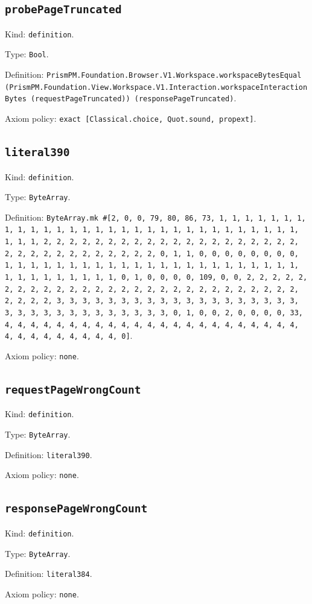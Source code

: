 \documentclass[11pt]{article}
\begin{document}
\subsection*{\texttt{probePageTruncated}}
\noindent Kind: \texttt{definition}.\par
\noindent Type: \texttt{Bool}.\par
\noindent Definition: \texttt{PrismPM.Foundation.Browser.V1.Workspace.workspaceBytesEqual (PrismPM.Foundation.View.Workspace.V1.Interaction.workspaceInteractionBytes (requestPageTruncated)) (responsePageTruncated)}.\par
\noindent Axiom policy: \texttt{exact [Classical.choice, Quot.sound, propext]}.\par
\subsection*{\texttt{literal390}}
\noindent Kind: \texttt{definition}.\par
\noindent Type: \texttt{ByteArray}.\par
\noindent Definition: \texttt{ByteArray.mk \#[2, 0, 0, 79, 80, 86, 73, 1, 1, 1, 1, 1, 1, 1, 1, 1, 1, 1, 1, 1, 1, 1, 1, 1, 1, 1, 1, 1, 1, 1, 1, 1, 1, 1, 1, 1, 1, 1, 1, 1, 2, 2, 2, 2, 2, 2, 2, 2, 2, 2, 2, 2, 2, 2, 2, 2, 2, 2, 2, 2, 2, 2, 2, 2, 2, 2, 2, 2, 2, 2, 2, 2, 0, 1, 1, 0, 0, 0, 0, 0, 0, 0, 0, 1, 1, 1, 1, 1, 1, 1, 1, 1, 1, 1, 1, 1, 1, 1, 1, 1, 1, 1, 1, 1, 1, 1, 1, 1, 1, 1, 1, 1, 1, 1, 1, 0, 1, 0, 0, 0, 0, 109, 0, 0, 2, 2, 2, 2, 2, 2, 2, 2, 2, 2, 2, 2, 2, 2, 2, 2, 2, 2, 2, 2, 2, 2, 2, 2, 2, 2, 2, 2, 2, 2, 2, 2, 3, 3, 3, 3, 3, 3, 3, 3, 3, 3, 3, 3, 3, 3, 3, 3, 3, 3, 3, 3, 3, 3, 3, 3, 3, 3, 3, 3, 3, 3, 3, 3, 0, 1, 0, 0, 2, 0, 0, 0, 0, 33, 4, 4, 4, 4, 4, 4, 4, 4, 4, 4, 4, 4, 4, 4, 4, 4, 4, 4, 4, 4, 4, 4, 4, 4, 4, 4, 4, 4, 4, 4, 4, 4, 0]}.\par
\noindent Axiom policy: \texttt{none}.\par
\subsection*{\texttt{requestPageWrongCount}}
\noindent Kind: \texttt{definition}.\par
\noindent Type: \texttt{ByteArray}.\par
\noindent Definition: \texttt{literal390}.\par
\noindent Axiom policy: \texttt{none}.\par
\subsection*{\texttt{responsePageWrongCount}}
\noindent Kind: \texttt{definition}.\par
\noindent Type: \texttt{ByteArray}.\par
\noindent Definition: \texttt{literal384}.\par
\noindent Axiom policy: \texttt{none}.\par
\end{document}
